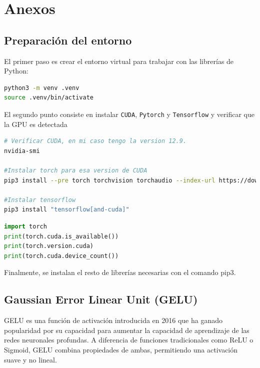\documentclass[11pt]{book}
\newcommand{\clearemptydoublepage}{\newpage{\pagestyle{empty}\cleardoublepage}}
\begin{document}
\clearemptydoublepage

\printbibliography[title={Referencias Bibliográficas}]

\appendix 
\chapter{Anexos}

\section{Preparación del entorno} \label{sec:entorno}

El primer paso es crear el entorno virtual para trabajar con las librerías de Python:
\begin{lstlisting}[language=bash]
python3 -m venv .venv
source .venv/bin/activate
\end{lstlisting}

El segundo punto consiste en instalar \texttt{CUDA}, \texttt{Pytorch} y \texttt{Tensorflow} y verificar que la GPU es detectada
\begin{lstlisting}[language=bash]
# Verificar CUDA, en mi caso tengo la version 12.9.
nvidia-smi

#Instalar torch para esa version de CUDA
pip3 install --pre torch torchvision torchaudio --index-url https://download.pytorch.org/whl/nightly/cu129

#Instalar tensorflow
pip3 install "tensorflow[and-cuda]"

\end{lstlisting}

\begin{lstlisting}[language=Python]
import torch
print(torch.cuda.is_available())
print(torch.version.cuda)
print(torch.cuda.device_count())
\end{lstlisting}

Finalmente, se instalan el resto de librerías necesarias con el comando pip3.


\section{Gaussian Error Linear Unit (GELU)} \label{sec:gelu}
GELU es una función de activación introducida en 2016 que ha ganado popularidad por su capacidad para aumentar la capacidad de aprendizaje de las redes neuronales profundas. A diferencia de funciones tradicionales como ReLU o Sigmoid, GELU combina propiedades de ambas, permitiendo una activación suave y no lineal. 
\end{document}
